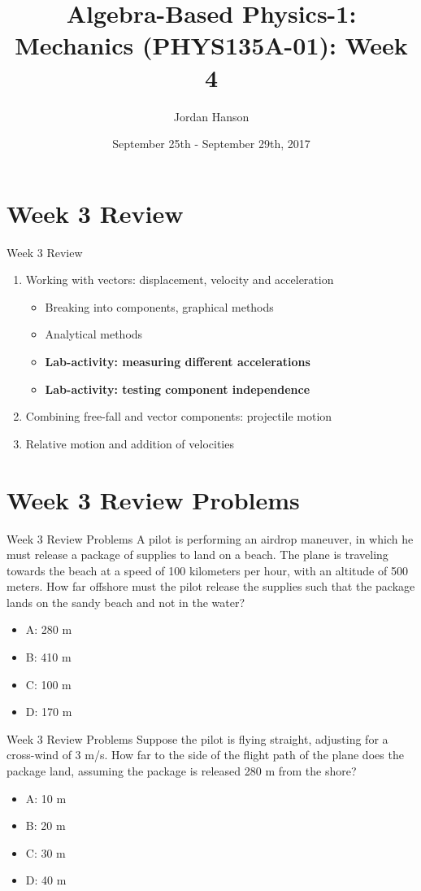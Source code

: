 \documentclass{beamer}
\title{Algebra-Based Physics-1: Mechanics (PHYS135A-01): Week 4}
\date{September 25th - September 29th, 2017}
\author{Jordan Hanson}
\institute{Whittier College Department of Physics and Astronomy}
\begin{document}
\maketitle

\section{Week 3 Review}

\begin{frame}{Week 3 Review}
\begin{enumerate}
\item Working with vectors: displacement, velocity and acceleration
\begin{itemize}
\item Breaking into components, graphical methods
\item Analytical methods
\item \textbf{Lab-activity: measuring different accelerations}
\item \textbf{Lab-activity: testing component independence}
\end{itemize}
\item Combining free-fall and vector components: \alert{projectile motion}
\item Relative motion and addition of velocities
\end{enumerate}
\end{frame}

\section{Week 3 Review Problems}

\begin{frame}{Week 3 Review Problems}
\small
A pilot is performing an airdrop maneuver, in which he must release a package of supplies to land on a beach.  The plane is traveling towards the beach at a speed of 100 kilometers per hour, with an altitude of 500 meters.  How far offshore must the pilot release the supplies such that the package lands on the sandy beach and not in the water?
\begin{itemize}
\item A: 280 m 
\item B: 410 m
\item C: 100 m
\item D: 170 m
\end{itemize}
\end{frame}

\begin{frame}{Week 3 Review Problems}
\small
Suppose the pilot is flying straight, adjusting for a cross-wind of 3 m/s.  How far to the side of the flight path of the plane does the package land, assuming the package is released 280 m from the shore?
\begin{itemize}
\item A: 10 m
\item B: 20 m
\item C: 30 m
\item D: 40 m
\end{itemize}
\end{frame}
\end{document}
